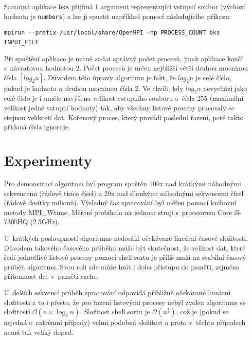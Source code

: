 \documentclass[11pt,a4paper,titlepage]{article}
\begin{document}
        Samotná aplikace \texttt{bks} přijímá 1 argument reprezentující vstupní soubor (výchozí hodnota je \texttt{numbers}) a lze ji spustit například pomocí následujícího příkazu:
\begin{verbatim}
mpirun --prefix /usr/local/share/OpenMPI -np PROCESS_COUNT bks INPUT_FILE
\end{verbatim}
        Při spuštění aplikace je nutné zadat správný počet procesů, jinak aplikace končí s~návratovou hodnotou 2.
        Počet procesů je určen nejbližší větší druhou mocninou čísla $\left \lceil{log_2 n}\right \rceil$.
        Důvodem této úpravy algoritmu je fakt, že $log_2 n$ je celé číslo, pokud je hodnota $n$ druhou
        mocninou čísla $2$. Ve chvíli, kdy $log_2 n$ nevychází jako celé číslo je i uměle navýšena velikost vstupního
        souboru o~čísla $255$ (maximální velikost jedné vstupní hodnoty) tak, aby všechny listové procesy pracovaly se stejnou
        velikostí dat. Kořenový proces, který provádí poslední řazení, poté takto přidaná čísla ignoruje.

	\section{Experimenty}
        Pro demonstraci algoritmu byl program spuštěn 100x nad krátkými náhodnými sekvencemi (řádově tisíce čísel) a 20x nad dlouhými náhodnými sekvencemi čísel (řádově desítky milionů).
        Výsledný čas zpracování byl měřen pomocí knihovní metody MPI\_Wtime. Měření probíhalo na jednom stroji s~procesorem Core i5-7300HQ (2.5GHz).

        U~krátkých posloupností algoritmus nedosáhl očekávané lineární časové složitosti. Důvodem takového časového průběhu může být skutečnost, že velikost dat, které řadí jednotlivé listové procesy pomocí shell sortu je příliš malá na stabilní časový průběh algoritmu. Svou roli zde může hrát i
        doba přístupu do paměti, zejména přítomnost dat v~paměti cache.

        U~delších sekvencí průběh zpracování odpovídá přibližně očekávané lineární složitosti a to i přesto, že pro řazení listovými procesy nebyl zvolen
        algoritmus se složitostí $\mathcal{O}(n \times \log_2 n)$. Složitost shell sortu je $\mathcal{O}(n^\frac{4}{3})$, což je (pokud se nejedná o~extrémní případy) velmi podobná složitost a proto v~těchto případech nemá tak veliký dopad.
\end{document}
